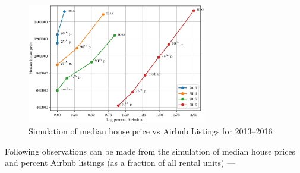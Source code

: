 \documentclass[10pt,letterpaper,onecolumn]{article}
\begin{document}
\begin{figure}[H]
  \centering
  \includegraphics[width=0.7\textwidth]{Median_house_price_vs_Log_percent_Airbnb_all.png}
  \caption{Simulation of median house price vs Airbnb Listings for 2013--2016}
\end{figure}

Following observations can be made from the simulation of median house
prices and percent Airbnb listings (as a fraction of all rental units) ---
\end{document}
